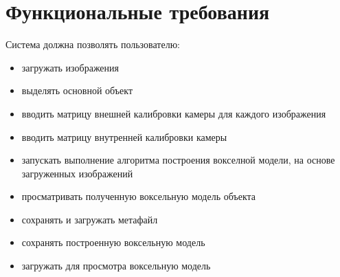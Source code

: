 \section{Функциональные требования}
Система должна позволять пользователю:
\begin{itemize}
\item загружать изображения
\item выделять основной объект
\item вводить матрицу внешней калибровки камеры для каждого изображения
\item вводить матрицу внутренней калибровки камеры
\item запускать выполнение алгоритма построения вокселной модели, на основе загруженных изображений
\item просматривать полученную воксельную модель объекта
\item сохранять и загружать метафайл
\item сохранять построенную воксельную модель
\item загружать для просмотра воксельную модель
\end{itemize}

